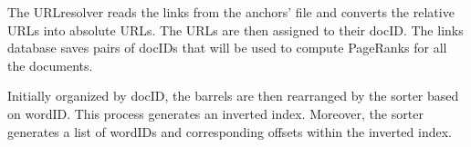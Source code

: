 The URLresolver reads the links from the anchors' file and converts the relative URLs into absolute URLs. The URLs are then assigned to their docID. The links database saves pairs of docIDs that will be used to compute PageRanks for all the documents. 

Initially organized by docID, the barrels are then rearranged by the sorter based on wordID. This process generates an inverted index. Moreover, the sorter generates a list of wordIDs and corresponding offsets within the inverted index. 
